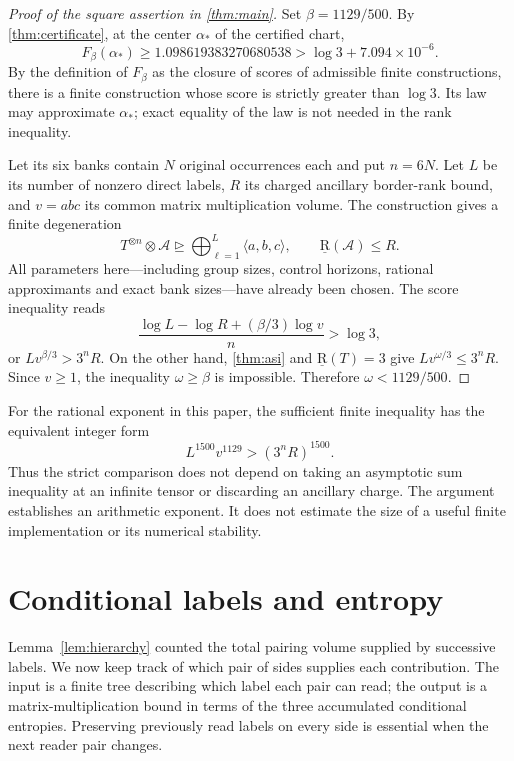 \documentclass[11pt]{article}
\numberwithin{equation}{section}
\theoremstyle{definition}
\theoremstyle{remark}
\begin{document}
\begin{proof}[Proof of the square assertion in \cref{thm:main}]
Set \(\beta=1129/500\).
By \cref{thm:certificate}, at the center \(\alpha_*\) of the certified chart,
\[
F_\beta(\alpha_*)\ge 1.098619383270680538
>\log3+7.094\times10^{-6}.
\]
By the definition of \(F_\beta\) as the closure of scores of admissible
finite constructions, there is a finite construction whose score is
strictly greater than \(\log3\).
Its law may approximate \(\alpha_*\); exact equality of the law is not
needed in the rank inequality.

Let its six banks contain \(N\) original occurrences each and put \(n=6N\).
Let \(L\) be its number of nonzero direct labels,
\(R\) its charged ancillary border-rank bound, and
\(v=abc\) its common matrix multiplication volume.
The construction gives a finite degeneration
\[
T^{\otimes n}\otimes\mathcal A
\unrhd\bigoplus_{\ell=1}^L\langle a,b,c\rangle,
\qquad \operatorname{\underline R}(\mathcal A)\le R.
\]
All parameters here---including group sizes, control horizons, rational
approximants and exact bank sizes---have already been chosen.
The score inequality reads
\[
\frac{\log L-\log R+(\beta/3)\log v}{n}>\log3,
\]
or \(Lv^{\beta/3}>3^nR\).
On the other hand, \cref{thm:asi} and \(\operatorname{\underline R}(T)=3\) give
\(Lv^{\omega/3}\le3^nR\).
Since \(v\ge1\), the inequality \(\omega\ge\beta\) is impossible.
Therefore \(\omega<1129/500\).
\end{proof}

For the rational exponent in this paper, the sufficient finite inequality
has the equivalent integer form
\[
L^{1500}v^{1129}>(3^nR)^{1500}.
\]
Thus the strict comparison does not depend on taking an asymptotic sum
inequality at an infinite tensor or discarding an ancillary charge.
The argument establishes an arithmetic exponent.  It does not estimate
the size of a useful finite implementation or its numerical stability.

\section{Conditional labels and entropy}\label{sec:trees}

Lemma~\ref{lem:hierarchy} counted the total pairing volume supplied by
successive labels.  We now keep track of which pair of sides supplies
each contribution.  The input is a finite tree describing which label
each pair can read; the output is a matrix-multiplication bound in
terms of the three accumulated conditional entropies.  Preserving
previously read labels on every side is essential when the next
reader pair changes.
\end{document}
